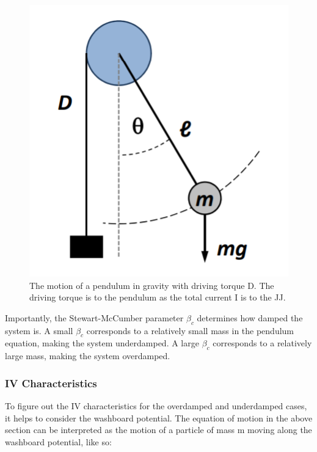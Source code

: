 \documentclass[conf]{new-aiaa}
\begin{document}
\begin{figure}[!ht]
    \centering
    \includegraphics[scale = 0.4]{pendulum.PNG}
    \caption{The motion of a pendulum in gravity with driving torque D. The driving torque is to the pendulum as the total current I is to the JJ.}
    \label{fig:my_label}
\end{figure}

Importantly, the Stewart-McCumber parameter $\beta_c$ determines how damped the system is. A small $\beta_c$ corresponds to a relatively small mass in the pendulum equation, making the system underdamped. A large $\beta_c$ corresponds to a relatively large mass, making the system overdamped. 

\subsubsection{IV Characteristics}
To figure out the IV characteristics for the overdamped and underdamped cases, it helps to consider the washboard potential. The equation of motion in the above section can be interpreted as the motion of a particle of mass m moving along the washboard potential, like so: 
\end{document}
